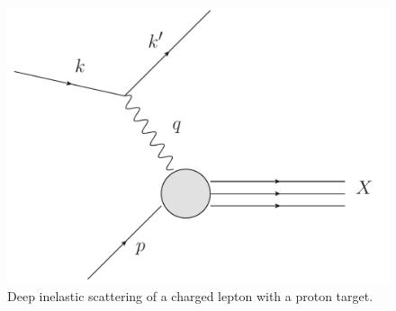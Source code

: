 \begin{figure}[ht]
\centering
\includegraphics[scale=0.5]{2-PDFs/figs/DIS.pdf}
\caption{Deep inelastic scattering of a charged lepton with a proton target.}
\label{fig:DIS}
\end{figure}

